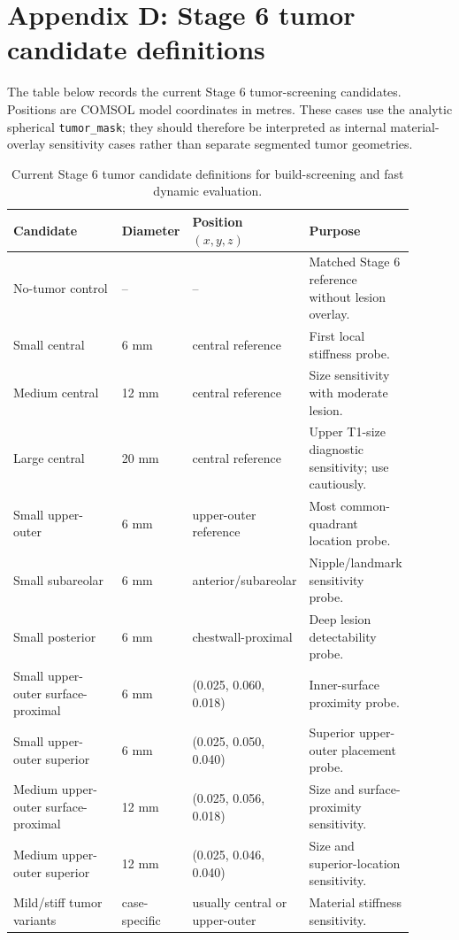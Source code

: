 \section*{Appendix D: Stage 6 tumor candidate definitions}
\label{sec:appendix_stage6_tumor_candidates}

The table below records the current Stage 6 tumor-screening candidates. Positions are COMSOL model coordinates in metres. These cases use the analytic spherical \texttt{tumor\_mask}; they should therefore be interpreted as internal material-overlay sensitivity cases rather than separate segmented tumor geometries.

\begin{table}[H]
\centering
\small
\caption{Current Stage 6 tumor candidate definitions for build-screening and fast dynamic evaluation.}
\label{tab:appendix_stage6_tumor_candidates}
\begin{tabular}{p{0.28\linewidth} p{0.15\linewidth} p{0.22\linewidth} p{0.25\linewidth}}
\toprule
Candidate & Diameter & Position $(x,y,z)$ & Purpose \\
\midrule
No-tumor control & -- & -- & Matched Stage 6 reference without lesion overlay. \\
Small central & 6 mm & central reference & First local stiffness probe. \\
Medium central & 12 mm & central reference & Size sensitivity with moderate lesion. \\
Large central & 20 mm & central reference & Upper T1-size diagnostic sensitivity; use cautiously. \\
Small upper-outer & 6 mm & upper-outer reference & Most common-quadrant location probe. \\
Small subareolar & 6 mm & anterior/subareolar & Nipple/landmark sensitivity probe. \\
Small posterior & 6 mm & chestwall-proximal & Deep lesion detectability probe. \\
Small upper-outer surface-proximal & 6 mm & (0.025, 0.060, 0.018) & Inner-surface proximity probe. \\
Small upper-outer superior & 6 mm & (0.025, 0.050, 0.040) & Superior upper-outer placement probe. \\
Medium upper-outer surface-proximal & 12 mm & (0.025, 0.056, 0.018) & Size and surface-proximity sensitivity. \\
Medium upper-outer superior & 12 mm & (0.025, 0.046, 0.040) & Size and superior-location sensitivity. \\
Mild/stiff tumor variants & case-specific & usually central or upper-outer & Material stiffness sensitivity. \\
\bottomrule
\end{tabular}
\end{table}

